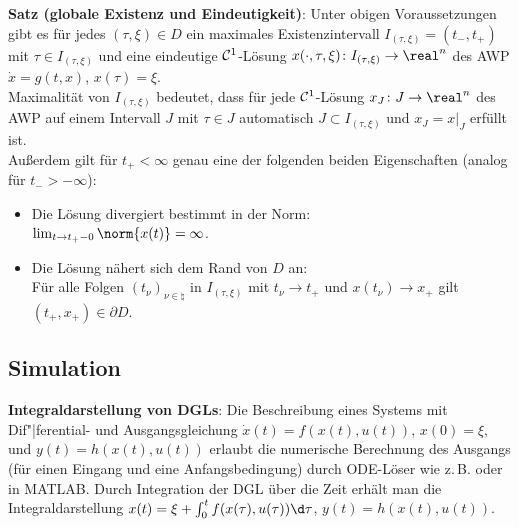 \textbf{Satz (globale Existenz und Eindeutigkeit)}:
Unter obigen Voraussetzungen gibt es für jedes $(\tau, \xi) \in D$ ein
maximales Existenzintervall $I_{(\tau, \xi)} = (t_-, t_+)$ mit $\tau \in I_{(\tau, \xi)}$
und eine eindeutige $\mathcal{C}^1$-Lösung
$x(\cdot, \tau, \xi)\colon I_{(\tau, \xi)} \rightarrow \real^n$
des AWP $\dot{x} = g(t, x)$, $x(\tau) = \xi$.\\
Maximalität von $I_{(\tau, \xi)}$ bedeutet, dass für jede $\mathcal{C}^1$-Lösung
$x_J\colon J \rightarrow \real^n$ des AWP auf einem Intervall $J$ mit $\tau \in J$
automatisch $J \subset I_{(\tau, \xi)}$ und $x_J = x|_J$ erfüllt ist.\\
Außerdem gilt für $t_+ < \infty$ genau eine der folgenden beiden Eigenschaften
(analog für $t_- > -\infty$):
\begin{itemize}
    \item
    Die Lösung divergiert bestimmt in der Norm:\\
    $\lim_{t \to t_+-0} \norm{x(t)} = \infty$.
    
    \item
    Die Lösung nähert sich dem Rand von $D$ an:\\
    Für alle Folgen $(t_\nu)_{\nu \in \natural}$ in $I_{(\tau, \xi)}$ mit
    $t_\nu \to t_+$ und $x(t_\nu) \to x_+$
    gilt $(t_+, x_+) \in \partial D$.
\end{itemize}

\pagebreak

\subsection{%
    Simulation%
}

\textbf{Integraldarstellung von DGLs}:
Die Beschreibung eines Systems mit Dif"|ferential- und Ausgangsgleichung
$\dot{x}(t) = f(x(t), u(t))$, $x(0) = \xi$, und $y(t) = h(x(t), u(t))$
erlaubt die numerische Berechnung des Ausgangs (für einen Eingang und eine Anfangsbedingung)
durch ODE-Löser wie z.\,B.  oder  in MATLAB.
Durch Integration der DGL über die Zeit erhält man die Integraldarstellung
$x(t) = \xi + \int_0^t f(x(\tau), u(\tau))\d\tau$, $y(t) = h(x(t), u(t))$.

